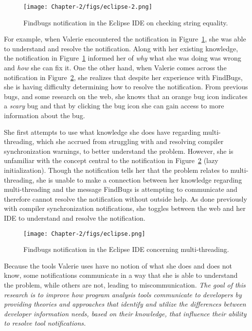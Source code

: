 \begin{figure} 
	\centering
	\texttt{[image: Chapter-2/figs/eclipse-2.png]}
	\caption{Findbugs notification in the Eclipse IDE on checking string equality.}
	\label{fig:eclipse2}
\end{figure}


For example, when Valerie encountered the notification in Figure~\ref{fig:eclipse2}, she was able to understand and resolve the notification. Along with her existing knowledge, the notification in Figure~\ref{fig:eclipse2} informed her of \emph{why} what she was doing was wrong and \emph{how} she can fix it.
One the other hand, when Valerie comes across the notification in Figure~\ref{fig:eclipse}, she realizes that despite her experience with FindBugs, she is having difficulty determining how to resolve the notification. 
From previous bugs, and some research on the web, she knows that an orange bug icon indicates a \textit{scary} bug and that by clicking the bug icon she can gain access to more information about the bug.

She first attempts to use what knowledge she does have regarding multi-threading, which she accrued from struggling with and resolving compiler synchronization warnings, to better understand the problem. 
However, she is unfamiliar with the concept central to the notification in Figure~\ref{fig:eclipse} (lazy initialization). Though the notification tells her that the problem relates to multi-threading, she is unable to make a connection between her knowledge regarding multi-threading and the message FindBugs is attempting to communicate and therefore cannot resolve the notification without outside help. As done previously with compiler synchronization notifications, she toggles between the web and her IDE to understand and resolve the notification.


\begin{figure}
	\centering
	\texttt{[image: Chapter-2/figs/eclipse.png]}
	\caption{Findbugs notification in the Eclipse IDE concerning multi-threading.}
	\label{fig:eclipse}
\end{figure} 




Because the tools Valerie uses have no notion of what she does and does not know, some notifications communicate in a way that she is able to understand the problem, while others are not, leading to  miscommunication.
\textit{The goal of this research is to improve how program analysis tools communicate to developers by providing theories and approaches that identify and utilize the differences between developer information needs, based on their knowledge, that influence their ability to resolve tool notifications.}

